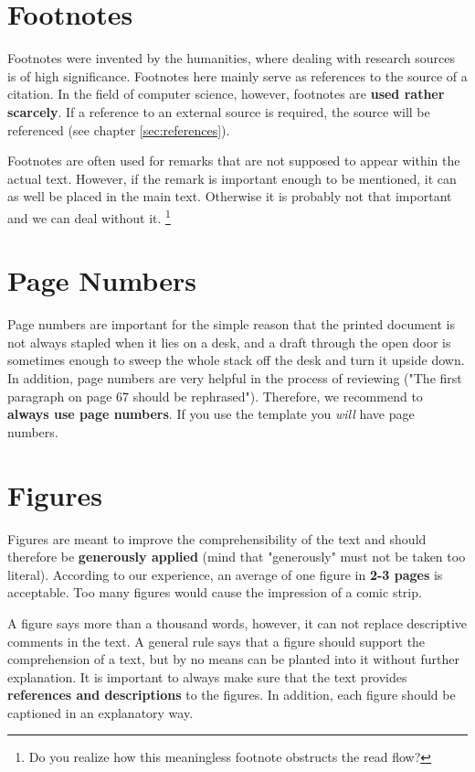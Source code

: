 \section{Footnotes}
Footnotes were invented by the humanities, where dealing with research sources is of high significance. Footnotes here mainly serve as references to the source of a citation. In the field of computer science, however, footnotes are \textbf{used rather scarcely}. If a reference to an external source is required, the source will be referenced (see chapter \ref{sec:references}).

Footnotes are often used for remarks that are not supposed to appear within the  actual text. However, if the remark is important enough to be mentioned, it can as well be placed in the main text. Otherwise it is probably not that important and we can deal without it.  \footnote{Do you realize how this meaningless footnote obstructs the read flow?}


\section{Page Numbers}
Page numbers are important for the simple reason that the printed document is not always stapled when it lies on a desk, and a draft through the open door is sometimes enough to sweep the whole stack off the desk and turn it upside down.
In addition, page numbers are very helpful in the process of reviewing ("The first paragraph on page 67 should be rephrased"). Therefore, we recommend to \textbf{always use page numbers}. If you use the template you \emph{will} have page numbers.


\section{Figures}
\label{sec:figures}
Figures are meant to improve the comprehensibility of the text and should therefore be \textbf{generously applied} (mind that "generously" must not be taken too literal). According to our experience, an average of one figure in \textbf{2-3 pages} is acceptable. Too many figures would cause the impression of a comic strip.

A figure says more than a thousand words, however, it can not replace descriptive comments in the text. A general rule says that a figure should support the comprehension of a text, but by no means can be planted into it without further explanation. It is important to always make sure that the text provides \textbf{references and descriptions} to the figures. In addition, each figure should be captioned in an explanatory way.


